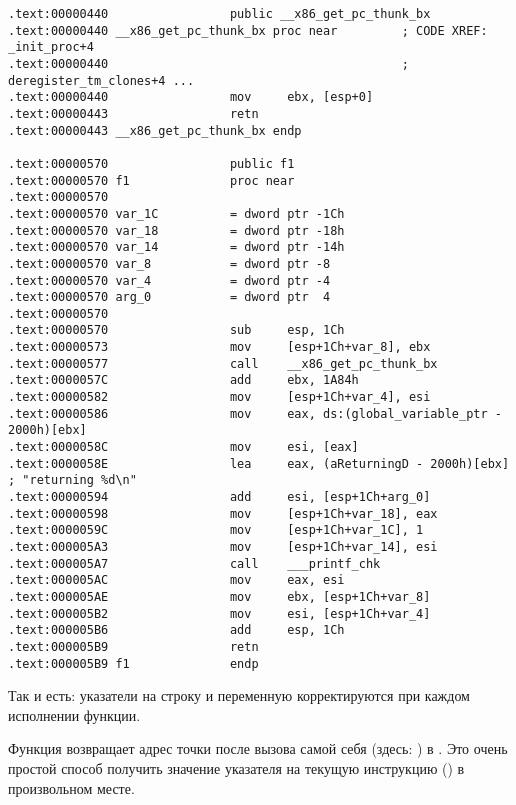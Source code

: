 \begin{lstlisting}[caption=GCC 4.7.3]
.text:00000440                 public __x86_get_pc_thunk_bx
.text:00000440 __x86_get_pc_thunk_bx proc near         ; CODE XREF: _init_proc+4
.text:00000440                                         ; deregister_tm_clones+4 ...
.text:00000440                 mov     ebx, [esp+0]
.text:00000443                 retn
.text:00000443 __x86_get_pc_thunk_bx endp

.text:00000570                 public f1
.text:00000570 f1              proc near
.text:00000570
.text:00000570 var_1C          = dword ptr -1Ch
.text:00000570 var_18          = dword ptr -18h
.text:00000570 var_14          = dword ptr -14h
.text:00000570 var_8           = dword ptr -8
.text:00000570 var_4           = dword ptr -4
.text:00000570 arg_0           = dword ptr  4
.text:00000570
.text:00000570                 sub     esp, 1Ch
.text:00000573                 mov     [esp+1Ch+var_8], ebx
.text:00000577                 call    __x86_get_pc_thunk_bx
.text:0000057C                 add     ebx, 1A84h
.text:00000582                 mov     [esp+1Ch+var_4], esi
.text:00000586                 mov     eax, ds:(global_variable_ptr - 2000h)[ebx]
.text:0000058C                 mov     esi, [eax]
.text:0000058E                 lea     eax, (aReturningD - 2000h)[ebx] ; "returning %d\n"
.text:00000594                 add     esi, [esp+1Ch+arg_0]
.text:00000598                 mov     [esp+1Ch+var_18], eax
.text:0000059C                 mov     [esp+1Ch+var_1C], 1
.text:000005A3                 mov     [esp+1Ch+var_14], esi
.text:000005A7                 call    ___printf_chk
.text:000005AC                 mov     eax, esi
.text:000005AE                 mov     ebx, [esp+1Ch+var_8]
.text:000005B2                 mov     esi, [esp+1Ch+var_4]
.text:000005B6                 add     esp, 1Ch
.text:000005B9                 retn
.text:000005B9 f1              endp
\end{lstlisting}

\newcommand{\retstring}{\IT{<<returning \%d\textbackslash{}n>>}}
\newcommand{\globvar}{\IT{global\_variable}}

Так и есть: указатели на строку \retstring{} и переменную \globvar{} корректируются при каждом исполнении функции.

\par Функция  возвращает адрес точки после вызова самой себя (здесь: ) в \EBX.
Это очень простой способ получить значение указателя на текущую инструкцию (\EIP) в произвольном месте.

